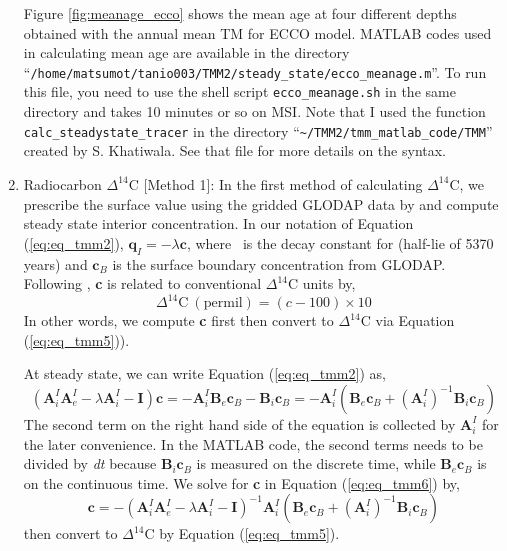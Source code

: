 \documentclass[a4paper]{article}
\begin{document}
\begin{enumerate}[label=(\arabic*)]
Figure \ref{fig:meanage_ecco} shows the mean age at four different depths obtained with the annual mean TM for ECCO model. MATLAB codes used in calculating mean age are available in the directory \\ ``\verb|/home/matsumot/tanio003/TMM2/steady_state/ecco_meanage.m|''. To run this file, you need to use the shell script \verb|ecco_meanage.sh| in the same directory and takes 10 minutes or so on MSI. Note that I used the function \verb|calc_steadystate_tracer| in the directory ``\verb|~/TMM2/tmm_matlab_code/TMM|'' created by S. Khatiwala. See that file for more details on the syntax. 

\item Radiocarbon $\Delta^{14}\mathrm{C}$ [Method 1]: In the first method of calculating $\Delta^{14}\mathrm{C}$, we prescribe the surface value using the gridded GLODAP data by \cite{Key04} and compute steady state interior concentration. In our notation of Equation (\ref{eq:eq_tmm2}), $\mathbf{q}_I = -\lambda\mathbf{c}$, where \lambda \ is the decay constant for  (half-lie of 5370 years) and $\mathbf{c}_B$ is the surface boundary concentration from GLODAP. Following \cite{Toggweiler89}, \textbf{c} is related to conventional $\Delta^{14}\mathrm{C}$ units by,
\begin{equation}
   \Delta^{14}\mathrm{C} \ (\mathrm{permil}) = (c - 100)\times 10   \label{eq:eq_tmm5}
\end{equation}
In other words, we compute \textbf{c} first then convert to  $\Delta^{14}\mathrm{C}$ via Equation (\ref{eq:eq_tmm5})).

At steady state, we can write Equation (\ref{eq:eq_tmm2}) as, 
\begin{equation}
   (\mathbf{A}_i^{I}\mathbf{A}_e^{I}-\lambda\mathbf{A}_i^{I}-\mathbf{I})\mathbf{c} =-\mathbf{A}_i^{I}\mathbf{B}_e\mathbf{c}_B - \mathbf{B}_i\mathbf{c}_B = -\mathbf{A}_i^{I}(\mathbf{B}_e\mathbf{c}_B+(\mathbf{A}_i^{I})^{-1}\mathbf{B}_i\mathbf{c}_B)   \label{eq:eq_tmm6}
\end{equation}
The second term on the right hand side of the equation is collected by $\mathbf{A}_i^{I}$ for the later convenience. In the MATLAB code, the second terms needs to be divided by \textit{dt} because $\mathbf{B}_i\mathbf{c}_B$ is measured on the discrete time, while $\mathbf{B}_e\mathbf{c}_B$ is on the continuous time. We solve for \textbf{c} in Equation (\ref{eq:eq_tmm6}) by,
\begin{equation}
   \mathbf{c} = -(\mathbf{A}_i^{I}\mathbf{A}_e^{I}-\lambda\mathbf{A}_i^{I}-\mathbf{I})^{-1}\mathbf{A}_i^{I}(\mathbf{B}_e\mathbf{c}_B+(\mathbf{A}_i^{I})^{-1}\mathbf{B}_i\mathbf{c}_B)   \label{eq:eq_tmm7}
\end{equation}
then convert to $\Delta^{14}\mathrm{C}$ by Equation (\ref{eq:eq_tmm5}). 


\end{enumerate}
\end{document}
